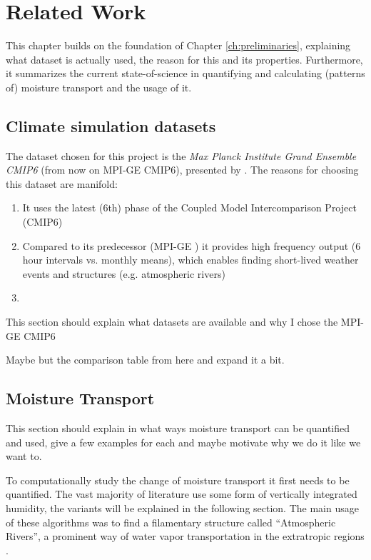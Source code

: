 \chapter{Related Work}
\label{ch:related_work}

This chapter builds on the foundation of Chapter \ref{ch:preliminaries}, explaining what dataset is actually used, the reason for this and its properties. 
Furthermore, it summarizes the current state-of-science in quantifying and calculating (patterns of) moisture transport and the usage of it.  


\section{Climate simulation datasets}

The dataset chosen for this project is the \textit{Max Planck Institute Grand Ensemble CMIP6} (from now on MPI-GE CMIP6), presented by \citeauthor{olonscheck_new_2023} \cite{olonscheck_new_2023}. 
The reasons for choosing this dataset are manifold:

\begin{enumerate}
  \item It uses the latest (6th) phase of the Coupled Model Intercomparison Project (CMIP6)
  \item Compared to its predecessor (MPI-GE \cite{maher_max_2019}) it provides high frequency output (6 hour intervals vs. monthly means), which enables finding short-lived weather events and structures (e.g. atmospheric rivers)
  \item 
\end{enumerate}


This section should explain what datasets are available and why I chose the MPI-GE CMIP6 \cite{olonscheck_new_2023}

Maybe but the comparison table from \cite{olonscheck_new_2023} here and expand it a bit. 


\section{Moisture Transport}

This section should explain in what ways moisture transport can be quantified and used, give a few examples for each and maybe motivate  why we do it like we want to. 

To computationally study the change of moisture transport it first needs to be quantified. 
The vast majority of literature use some form of vertically integrated humidity, the variants will be explained in the following section.  
The main usage of these algorithms was to find a filamentary structure called \enquote{Atmospheric Rivers}, a prominent way of water vapor transportation in the extratropic regions \cite{gimeno_atmospheric_2014}. 

